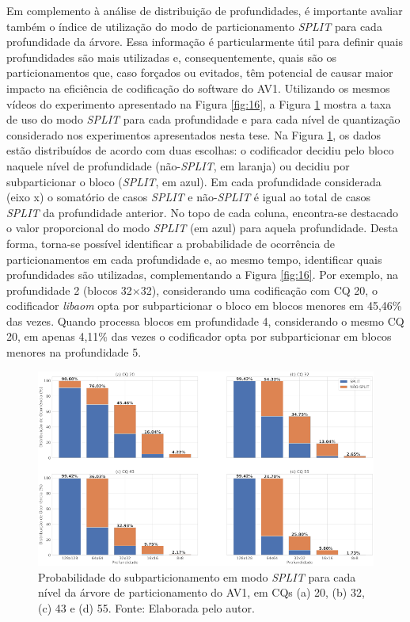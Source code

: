 Em complemento à análise de distribuição de profundidades, é importante avaliar também o índice de utilização do modo de particionamento \textit{SPLIT} para cada profundidade da árvore. Essa informação é particularmente útil para definir quais profundidades são mais utilizadas e, consequentemente, quais são os particionamentos que, caso forçados ou evitados, têm potencial de causar maior impacto na eficiência de codificação do software do AV1. Utilizando os mesmos vídeos do experimento apresentado na Figura \ref{fig:16}, a Figura \ref{fig:17} mostra a taxa de uso do modo \textit{SPLIT} para cada profundidade e para cada nível de quantização considerado nos experimentos apresentados nesta tese. Na Figura \ref{fig:17}, os dados estão distribuídos de acordo com duas escolhas: o codificador decidiu pelo bloco naquele nível de profundidade (não-\textit{SPLIT}, em laranja) ou decidiu por subparticionar o bloco (\textit{SPLIT}, em azul). Em cada profundidade considerada (eixo x) o somatório de casos \textit{SPLIT} e não-\textit{SPLIT} é igual ao total de casos \textit{SPLIT} da profundidade anterior. No topo de cada coluna, encontra-se destacado o valor proporcional do modo \textit{SPLIT} (em azul) para aquela profundidade. Desta forma, torna-se possível identificar a probabilidade de ocorrência de particionamentos em cada profundidade e, ao mesmo tempo, identificar quais profundidades são utilizadas, complementando a Figura \ref{fig:16}. Por exemplo, na profundidade 2 (blocos 32$\times$32), considerando uma codificação com CQ 20, o codificador \textit{libaom} opta por subparticionar o bloco em blocos menores em 45,46\% das vezes. Quando processa blocos em profundidade 4, considerando o mesmo CQ 20, em apenas 4,11\% das vezes o codificador opta por subparticionar em blocos menores na profundidade 5.

\begin{figure}
    \centering
    \includegraphics[width=\textwidth]{FIGURES/fig_17.png}
    \caption{Probabilidade do subparticionamento em modo \textit{SPLIT} para cada nível da árvore de particionamento do AV1, em CQs (a) 20, (b) 32, (c) 43 e (d) 55. Fonte: Elaborada pelo autor.}
    \label{fig:17}
\end{figure}

